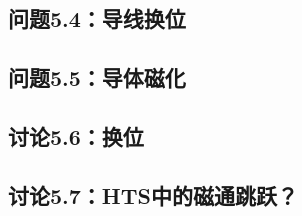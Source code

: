 \subsection{问题5.4：导线换位}


\subsection{问题5.5：导体磁化}


\subsection{讨论5.6：换位}


\subsection{讨论5.7：HTS中的磁通跳跃？}